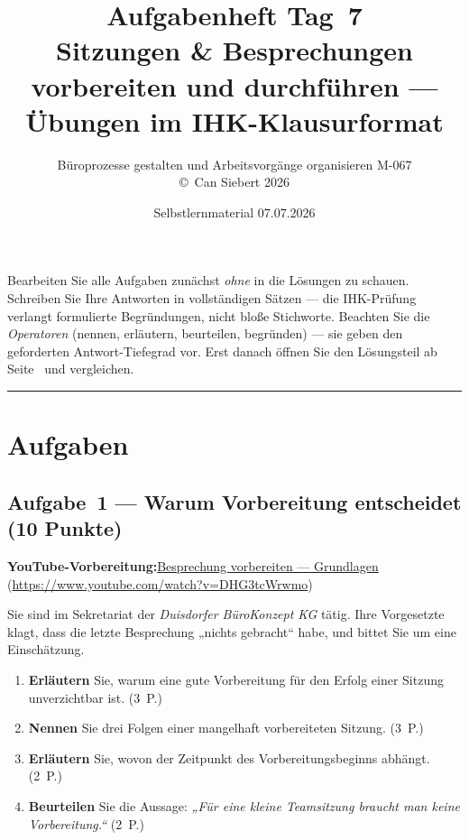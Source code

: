 \documentclass[11pt, a4paper]{article}
\title{\vspace*{-1.5cm}\Huge\bfseries\color{bfwPrimaryDark}Aufgabenheft Tag~7\\[0.4em]
  \large\color{bfwInkSoft}\textnormal{Sitzungen \& Besprechungen vorbereiten und durchführen --- Übungen im IHK-Klausurformat}}
\author{\textsf{Büroprozesse gestalten und Arbeitsvorgänge organisieren \textperiodcentered{} M-067}\\
\textsf{\small\copyright\ Can Siebert\,\textperiodcentered\,2026}}
\date{Selbstlernmaterial \textperiodcentered{} 07.07.2026}
\begin{document}
\maketitle
\thispagestyle{empty}

\begin{merksatz}[title={\bfseries So nutzen Sie dieses Aufgabenheft}]
Bearbeiten Sie alle Aufgaben zunächst \emph{ohne} in die Lösungen zu schauen. Schreiben
Sie Ihre Antworten in vollständigen Sätzen --- die IHK-Prüfung verlangt formulierte
Begründungen, nicht bloße Stichworte. Beachten Sie die \emph{Operatoren} (nennen,
erläutern, beurteilen, begründen) --- sie geben den geforderten Antwort-Tiefegrad vor.
Erst danach öffnen Sie den Lösungsteil ab Seite~\pageref{loesungen} und vergleichen.
\end{merksatz}

\tableofcontents
\vspace{1em}
\hrule

\section{Aufgaben}

\subsection*{Aufgabe~1 --- Warum Vorbereitung entscheidet (10 Punkte)}

\noindent\textbf{\color{bfwAccent}YouTube-Vorbereitung:}\enspace \href{https://www.youtube.com/watch?v=DHG3tcWrwmo}{Besprechung vorbereiten --- Grundlagen} (\url{https://www.youtube.com/watch?v=DHG3tcWrwmo})

\medskip
Sie sind im Sekretariat der \emph{Duisdorfer BüroKonzept KG} tätig. Ihre Vorgesetzte klagt,
dass die letzte Besprechung „nichts gebracht“ habe, und bittet Sie um eine Einschätzung.

\begin{enumerate}[label=(\alph*)]
  \item \textbf{Erläutern} Sie, warum eine gute Vorbereitung für den Erfolg einer Sitzung unverzichtbar ist. \hfill (3~P.)
  \item \textbf{Nennen} Sie drei Folgen einer mangelhaft vorbereiteten Sitzung. \hfill (3~P.)
  \item \textbf{Erläutern} Sie, wovon der Zeitpunkt des Vorbereitungsbeginns abhängt. \hfill (2~P.)
  \item \textbf{Beurteilen} Sie die Aussage: \emph{„Für eine kleine Teamsitzung braucht man keine Vorbereitung.“} \hfill (2~P.)
\end{enumerate}
\end{document}
